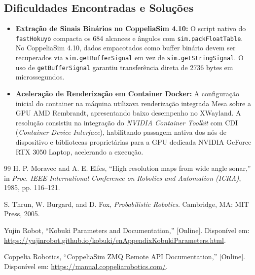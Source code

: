 \documentclass[11pt,a4paper]{article}
\begin{document}
\subsection{Dificuldades Encontradas e Soluções}
\begin{itemize}
    \item \textbf{Extração de Sinais Binários no CoppeliaSim 4.10:} O script nativo do \texttt{fastHokuyo} compacta os 684 alcances e ângulos com \texttt{sim.packFloatTable}. No CoppeliaSim 4.10, dados empacotados como buffer binário devem ser recuperados via \texttt{sim.getBufferSignal} em vez de \texttt{sim.getStringSignal}. O uso de \texttt{getBufferSignal} garantiu transferência direta de 2736 bytes em microssegundos.
    \item \textbf{Aceleração de Renderização em Container Docker:} A configuração inicial do container na máquina utilizava renderização integrada Mesa sobre a GPU AMD Rembrandt, apresentando baixo desempenho no XWayland. A resolução consistiu na integração do \textit{NVIDIA Container Toolkit} com CDI (\textit{Container Device Interface}), habilitando passagem nativa dos nós de dispositivo e bibliotecas proprietárias para a GPU dedicada NVIDIA GeForce RTX 3050 Laptop, acelerando a execução.
\end{itemize}

\begin{thebibliography}{99}
H. P. Moravec and A. E. Elfes, ``High resolution maps from wide angle sonar,'' in \textit{Proc. IEEE International Conference on Robotics and Automation (ICRA)}, 1985, pp. 116--121.

S. Thrun, W. Burgard, and D. Fox, \textit{Probabilistic Robotics}. Cambridge, MA: MIT Press, 2005.

Yujin Robot, ``Kobuki Parameters and Documentation,'' [Online]. Disponível em: \url{https://yujinrobot.github.io/kobuki/enAppendixKobukiParameters.html}.

Coppelia Robotics, ``CoppeliaSim ZMQ Remote API Documentation,'' [Online]. Disponível em: \url{https://manual.coppeliarobotics.com/}.
\end{thebibliography}
\end{document}
